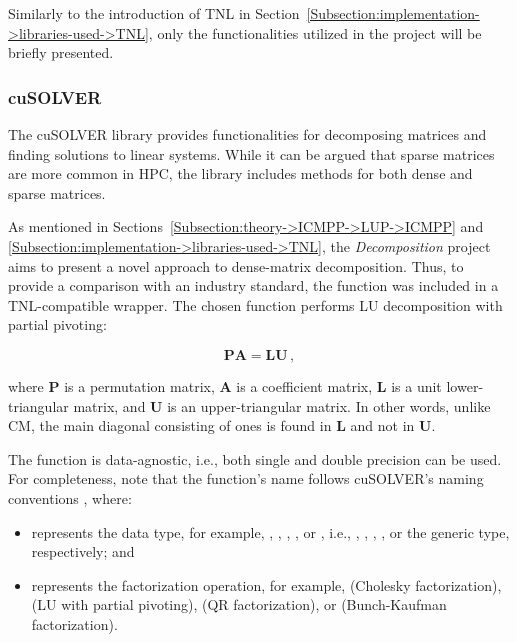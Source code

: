 Similarly to the introduction of TNL in Section~\ref{Subsection:implementation->libraries-used->TNL}, only the functionalities utilized in the project will be briefly presented.

\subsubsection{cuSOLVER}\label{Subsection:implementation->libraries-used->CUDA-libraries->cuSOLVER}
The cuSOLVER library provides functionalities for decomposing matrices and finding solutions to linear systems. While it can be argued that sparse matrices are more common in HPC, the library includes methods for both dense and sparse matrices.

As mentioned in Sections~\ref{Subsection:theory->ICMPP->LUP->ICMPP} and \ref{Subsection:implementation->libraries-used->TNL}, the \textit{Decomposition} project aims to present a novel approach to dense-matrix decomposition. Thus, to provide a comparison with an industry standard, the  function was included in a TNL-compatible wrapper. The chosen function performs LU decomposition with partial pivoting:

\begin{equation}
	\mathbf{PA} = \mathbf{LU} \,,
\end{equation}

where $\mathbf{P}$ is a permutation matrix, $\mathbf{A}$ is a coefficient matrix, $\mathbf{L}$ is a unit lower-triangular matrix, and $\mathbf{U}$ is an upper-triangular matrix. In other words, unlike CM, the main diagonal consisting of ones is found in $\mathbf{L}$ and not in $\mathbf{U}$.

The function is data-agnostic, i.e., both single and double precision can be used. For completeness, note that the function's name follows cuSOLVER's naming conventions  \cite{5D33zKi5iStCty0r}, where:

\begin{itemize}
	\item {} represents the data type, for example, , , , , or , i.e., , , , , or the generic type, respectively; and
	\item {} represents the factorization operation, for example,  (Cholesky factorization),  (LU with partial pivoting),  (QR factorization), or  (Bunch-Kaufman factorization).
\end{itemize}

